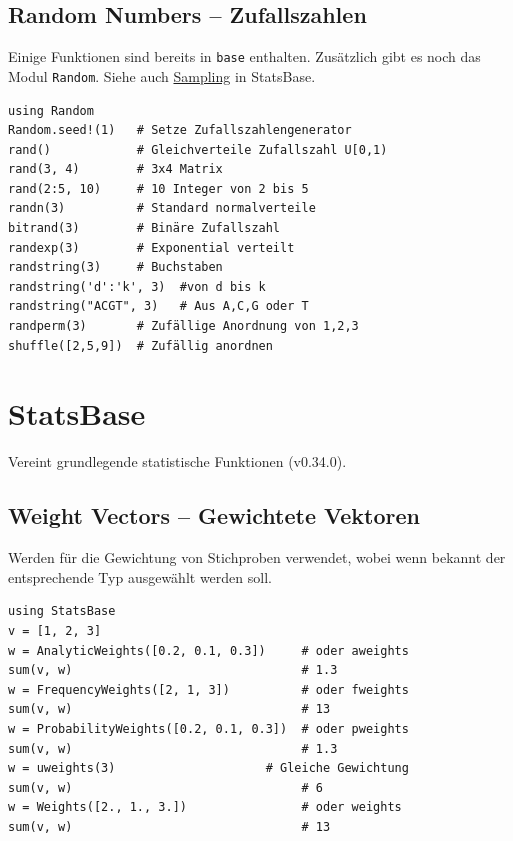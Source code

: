 \documentclass[10pt,twocolumn]{scrartcl}
\begin{document}
\subsection{Random Numbers -- Zufallszahlen}
\label{ssec:standardLibrary_Random}

Einige Funktionen sind bereits in \lstinline|base| enthalten. Zusätzlich gibt es
noch das Modul \lstinline|Random|. Siehe auch
\hyperref[ssec:StatsBase_Sampling]{Sampling} in StatsBase.

\begin{lstlisting}
using Random
Random.seed!(1)   # Setze Zufallszahlengenerator
rand()            # Gleichverteile Zufallszahl U[0,1)
rand(3, 4)        # 3x4 Matrix
rand(2:5, 10)     # 10 Integer von 2 bis 5
randn(3)          # Standard normalverteile
bitrand(3)        # Binäre Zufallszahl
randexp(3)        # Exponential verteilt
randstring(3)     # Buchstaben
randstring('d':'k', 3)  #von d bis k
randstring("ACGT", 3)   # Aus A,C,G oder T
randperm(3)       # Zufällige Anordnung von 1,2,3
shuffle([2,5,9])  # Zufällig anordnen
\end{lstlisting}

\section{StatsBase}
\label{sec:StatsBase}

Vereint grundlegende statistische Funktionen (v0.34.0).

\subsection{Weight Vectors -- Gewichtete Vektoren}

Werden für die Gewichtung von Stichproben verwendet, wobei wenn bekannt der
entsprechende Typ ausgewählt werden soll.

\begin{lstlisting}
using StatsBase
v = [1, 2, 3]
w = AnalyticWeights([0.2, 0.1, 0.3])     # oder aweights
sum(v, w)                                # 1.3
w = FrequencyWeights([2, 1, 3])          # oder fweights
sum(v, w)                                # 13
w = ProbabilityWeights([0.2, 0.1, 0.3])  # oder pweights
sum(v, w)                                # 1.3
w = uweights(3)                     # Gleiche Gewichtung
sum(v, w)                                # 6
w = Weights([2., 1., 3.])                # oder weights
sum(v, w)                                # 13
\end{lstlisting}
\end{document}
